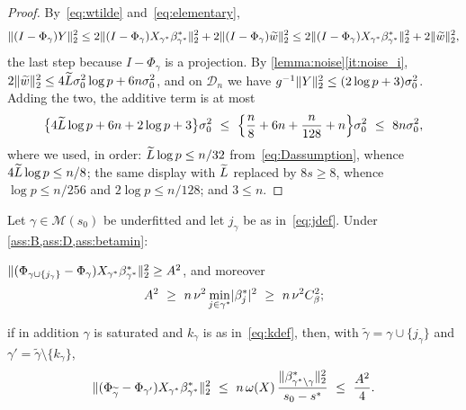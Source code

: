 \begin{proof}
    By~\eqref{eq:wtilde} and~\eqref{eq:elementary},
    \begin{equation*}
        \lVert(I-\Phi_\gamma)Y\rVert_2^{2}
        \leq2\lVert(I-\Phi_\gamma)X_{\gamma^{\ast}}\beta^{\ast}_{\gamma^{\ast}}\rVert_2^{2}
        +2\lVert(I-\Phi_\gamma)\widetilde w\rVert_2^{2}
        \leq2\lVert(I-\Phi_\gamma)X_{\gamma^{\ast}}\beta^{\ast}_{\gamma^{\ast}}\rVert_2^{2}
        +2\lVert\widetilde w\rVert_2^{2},
    \end{equation*}
    the last step because $I-\Phi_\gamma$ is a projection. By
    \cref{lemma:noise}\ref{it:noise_i}, $2\lVert\widetilde w\rVert_2^{2}\leq
    4\widetilde{L}\sigma_0^{2}\log p+6n\sigma_0^{2}$, and on $\mathcal{D}_n$ we
    have $g^{-1}\lVert Y\rVert_2^{2}\leq(2\log p+3)\sigma_0^{2}$. Adding the two,
    the additive term is at most
    \begin{equation*}
        \bigl\{4\widetilde{L}\log p+6n+2\log p+3\bigr\}\sigma_0^{2}
        \ \leq\ \Bigl\{\frac n8+6n+\frac{n}{128}+n\Bigr\}\sigma_0^{2}
        \ \leq\ 8n\sigma_0^{2},
    \end{equation*}
    where we used, in order: $\widetilde{L}\log p\leq n/32$
    from~\eqref{eq:Dassumption}, whence $4\widetilde{L}\log p\leq n/8$; the same display
    with $\widetilde{L}$ replaced by $8s\geq8$, whence $\log p\leq n/256$ and
    $2\log p\leq n/128$; and $3\leq n$.
\end{proof}

\begin{lemma}
    \label{lemma:forward}
    Let $\gamma\in\mathscr{M}(s_0)$ be underfitted and let $j_\gamma$ be
    as in~\eqref{eq:jdef}. Under \cref{ass:B,ass:D,ass:betamin}:
    \begin{equivcond}
        \item\label{it:fs_a}
        $\lVert(\Phi_{\gamma\cup\{j_\gamma\}}-\Phi_\gamma)
            X_{\gamma^{\ast}}\beta^{\ast}_{\gamma^{\ast}}\rVert_2^{2}\geq A^{2}$, and moreover
        \begin{equation}
            \label{eq:Alower}
            A^{2}\ \geq\ n\,\nu^{2}\min_{j\in\gamma^{\ast}}
            \lvert\beta^\ast_j\rvert^{2}
            \ \geq\ n\,\nu^{2}C_\beta^{2} ;
        \end{equation}
        \item\label{it:fs_b} if in addition $\gamma$ is saturated and
        $k_\gamma$ is as in~\eqref{eq:kdef}, then, with
        $\widetilde\gamma=\gamma\cup\{j_\gamma\}$ and
        $\gamma'=\widetilde\gamma\setminus\{k_\gamma\}$,
        \begin{equation*}
            \lVert(\Phi_{\widetilde\gamma}-\Phi_{\gamma'})
                X_{\gamma^{\ast}}\beta^{\ast}_{\gamma^{\ast}}\rVert_2^{2}
            \ \leq\ n\,\omega(X)\,
            \frac{\lVert\beta^\ast_{\gamma^{\ast}\setminus\gamma}\rVert_2^{2}}
            {s_0-s^{\ast}}
            \ \leq\ \frac{A^{2}}{4} .
        \end{equation*}
    \end{equivcond}
\end{lemma}

